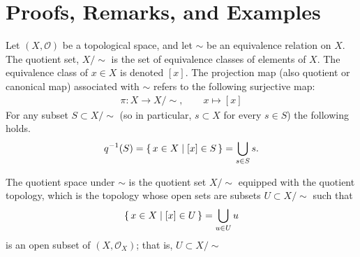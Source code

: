 \section{Proofs, Remarks, and Examples}
\begin{defbox}
    \begin{definition}
        Let \((X, \mathcal{O})\) be a {\color{mathif}topological space}, and let \(\sim\) be an {\color{mathif}equivalence relation} on \(X\). The {\color{maththen}quotient set}, \(X / \sim\) is the {\color{mathobj}set} of {\color{mathobj}equivalence classes} of elements of \(X\). The equivalence class of \(x \in X\) is {\color{mathrem}denoted} \([x]\). The {\color{maththen}projection map} (also {\color{mathrem}quotient} or {\color{mathrem}canonical map}) associated with \(\sim\) refers to the following {\color{mathif}surjective map}:
        \begin{align*}
            \pi: X \longrightarrow X / \sim, \qquad x \mapsto [x]
        \end{align*}
        For any subset \(S \subset X / \sim\) (so in particular, \(s \subset X\) for every \(s \in S\)) the following holds.
        \begin{align*}
            q^{-1}(S) = \left\{\, x \in X \mid [x] \in S \,\right\} = \bigcup_{s \in S} s \text{.}
        \end{align*}

        The quotient space under \(\sim\) is the quotient set \(X / \sim\) equipped with the quotient topology, which is the topology whose open sets are subsets \(U \subset X / \sim\) such that 
        \begin{align*}
            \left\{\, x \in X \mid [x] \in U \,\right\} = \bigcup_{u \in U}u
        \end{align*}
        is an open subset of \((X, \mathcal{O}_X)\); that is, \(U \subset X / \sim\)
    \end{definition}
\end{defbox}
%
